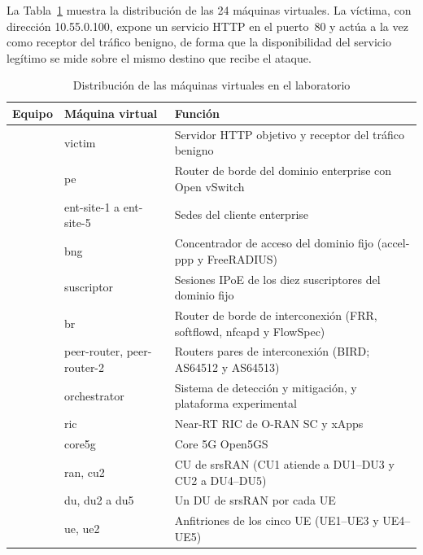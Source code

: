 La Tabla~\ref{tab:distribucion_vm} muestra la distribución de las 24 máquinas virtuales. La víctima, con dirección 10.55.0.100, expone un servicio HTTP en el puerto~80 y actúa a la vez como receptor del tráfico benigno, de forma que la disponibilidad del servicio legítimo se mide sobre el mismo destino que recibe el ataque.

\begin{table}[H]
    \begin{center}
        \renewcommand{\arraystretch}{1.5}
        \fontsize{10}{12}\selectfont
        \begin{tabular}{ >{\arraybackslash}m{3cm} >{\arraybackslash}m{4.5cm} >{\arraybackslash}m{6.5cm} }
        \hline
        \textbf{Equipo} & \textbf{Máquina virtual} & \textbf{Función} \\ \hline
        \multirow{7}{*}{\parbox{3cm}{Workstation}} & victim & Servidor HTTP objetivo y receptor del tráfico benigno \\ \cline{2-3}
        & pe & Router de borde del dominio enterprise con Open vSwitch \\ \cline{2-3}
        & ent-site-1 a ent-site-5 & Sedes del cliente enterprise \\ \cline{2-3}
        & bng & Concentrador de acceso del dominio fijo (accel-ppp y FreeRADIUS) \\ \cline{2-3}
        & suscriptor & Sesiones IPoE de los diez suscriptores del dominio fijo \\ \cline{2-3}
        & br & Router de borde de interconexión (FRR, softflowd, nfcapd y FlowSpec) \\ \cline{2-3}
        & peer-router, peer-router-2 & Routers pares de interconexión (BIRD; AS64512 y AS64513) \\ \hline
        \multirow{6}{*}{\parbox{3cm}{Servidor}} & orchestrator & Sistema de detección y mitigación, y plataforma experimental \\ \cline{2-3}
        & ric & Near-RT RIC de O-RAN SC y xApps \\ \cline{2-3}
        & core5g & Core 5G Open5GS \\ \cline{2-3}
        & ran, cu2 & CU de srsRAN (CU1 atiende a DU1--DU3 y CU2 a DU4--DU5) \\ \cline{2-3}
        & du, du2 a du5 & Un DU de srsRAN por cada UE \\ \cline{2-3}
        & ue, ue2 & Anfitriones de los cinco UE (UE1--UE3 y UE4--UE5) \\ \hline
        \end{tabular}
        \caption{Distribución de las máquinas virtuales en el laboratorio}
        \label{tab:distribucion_vm}
    \end{center}
\end{table}

